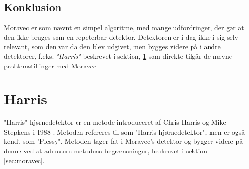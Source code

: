 \subsection*{Konklusion}
Moravec er som nævnt en simpel algoritme, med mange udfordringer, der gør at den ikke bruges som en repeterbar detektor. Detektoren er i dag ikke i sig selv relevant, som den var da den blev udgivet, men bygges videre på i andre detektorer, f.eks. \textit{"Harris"} beskrevet i sektion, \ref{sec:harris} som direkte tilgår de nævne problemstillinger med Moravec.
\section{Harris}\label{sec:harris}
"Harris" hjørnedetektor er en metode introduceret af Chris Harris og Mike Stephens i 1988 \cite{harris}. Metoden refereres til som "Harris hjørnedetektor", men er også kendt som "Plessy". Metoden tager fat i Moravec's detektor og bygger videre på denne ved at adressere metodens begrænsninger, beskrevet i sektion \ref{sec:moravec}.
